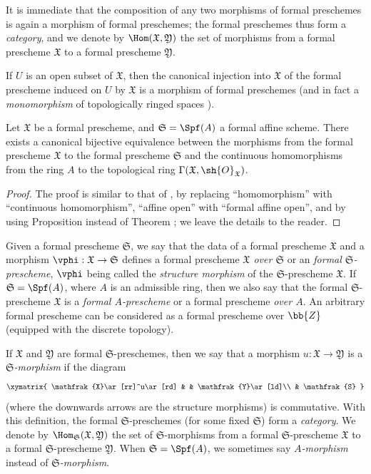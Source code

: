 It is immediate that the composition of any two morphisms of formal preschemes is again a morphism of formal preschemes; the formal preschemes thus form a \emph{category}, and we denote by $\Hom(\mathfrak{X},\mathfrak{Y})$ the set of morphisms from a formal prescheme $\mathfrak{X}$ to a formal prescheme $\mathfrak{Y}$.

If $U$ is an open subset of $\mathfrak{X}$, then the canonical injection into $\mathfrak{X}$ of the formal prescheme induced on $U$ by $\mathfrak{X}$ is a morphism of formal preschemes (and in fact a \emph{monomorphism} of topologically ringed spaces ).

\begin{proposition}[10.4.6]
\label{I.10.4.6}
Let $\mathfrak{X}$ be a formal prescheme, and $\mathfrak{S}=\Spf(A)$ a formal affine scheme.
There exists a canonical bijective equivalence between the morphisms from the formal prescheme $\mathfrak{X}$ to the formal prescheme $\mathfrak{S}$ and the continuous homomorphisms from the ring $A$ to the topological ring $\Gamma(\mathfrak{X},\sh{O}_\mathfrak{X})$.
\end{proposition}

\begin{proof}
The proof is similar to that of , by replacing ``homomorphism'' with ``continuous homomorphism'', ``affine open'' with ``formal affine open'', and by using Proposition  instead of Theorem ; we leave the details to the reader.
\end{proof}

\begin{env}[10.4.7]
\label{I.10.4.7}
Given a formal prescheme $\mathfrak{S}$, we say that the data of a formal prescheme $\mathfrak{X}$ and a morphism $\vphi:\mathfrak{X}\to\mathfrak{S}$ defines a formal prescheme \emph{$\mathfrak{X}$ over $\mathfrak{S}$} or an \emph{formal $\mathfrak{S}$-prescheme}, $\vphi$ being called the \emph{structure morphism} of the $\mathfrak{S}$-prescheme $\mathfrak{X}$.
If $\mathfrak{S}=\Spf(A)$, where $A$ is an admissible ring, then we also say that the formal $\mathfrak{S}$-prescheme $\mathfrak{X}$ is a \emph{formal $A$-prescheme} or a formal prescheme \emph{over $A$}.
An arbitrary formal prescheme can be considered as a formal prescheme over $\bb{Z}$ (equipped with the discrete topology).

If $\mathfrak{X}$ and $\mathfrak{Y}$ are formal $\mathfrak{S}$-preschemes, then we say that a morphism $u:\mathfrak{X}\to\mathfrak{Y}$ is a \emph{$\mathfrak{S}$-morphism} if the diagram
\[
  \xymatrix{
    \mathfrak{X}\ar[rr]^u\ar[rd] & &
    \mathfrak{Y}\ar[ld]\\
    & \mathfrak{S}
  }
\]
(where the downwards arrows are the structure morphisms) is commutative.
With this definition, the formal $\mathfrak{S}$-preschemes (for some fixed $\mathfrak{S}$) form a \emph{category}.
We denote by $\Hom_\mathfrak{S}(\mathfrak{X},\mathfrak{Y})$ the set of $\mathfrak{S}$-morphisms from a formal $\mathfrak{S}$-prescheme $\mathfrak{X}$ to a formal $\mathfrak{S}$-prescheme $\mathfrak{Y}$.
When $\mathfrak{S}=\Spf(A)$, we sometimes say \emph{$A$-morphism} instead of \emph{$\mathfrak{S}$-morphism}.
\end{env}

